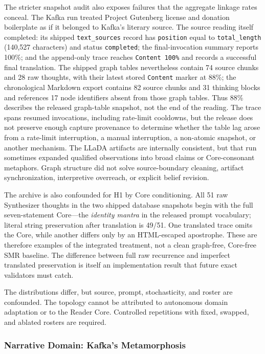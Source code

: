 The stricter snapshot audit also exposes failures that the aggregate linkage
rates conceal. The Kafka run treated Project Gutenberg license and donation
boilerplate as if it belonged to Kafka's literary source. The source reading
itself completed: its shipped \texttt{text\_sources} record has \texttt{position}
equal to \texttt{total\_length} (140,527 characters) and status
\texttt{completed}; the final-invocation summary reports 100\%; and the
append-only trace reaches \texttt{Content 100\%} and records a successful final
translation. The shipped graph tables nevertheless contain 74 source chunks and
28 raw thoughts, with their latest stored \texttt{Content} marker at 88\%; the
chronological Markdown export contains 82 source chunks and 31 thinking blocks
and references 17 node identifiers absent from those graph tables. Thus 88\%
describes the released graph-table snapshot, not the end of the reading. The
trace spans resumed invocations, including rate-limit cooldowns, but the release
does not preserve enough capture provenance to determine whether the table lag
arose from a rate-limit interruption, a manual interruption, a non-atomic
snapshot, or another mechanism.
The LLaDA artifacts are internally consistent, but that run sometimes
expanded qualified observations into broad claims or Core-consonant metaphors.
Graph structure did not solve source-boundary cleaning, artifact synchronization, interpretive overreach, or explicit belief revision.

The archive is also confounded for H1 by Core conditioning. All 51 raw
Synthesizer thoughts in the two shipped database snapshots begin with the full
seven-statement Core---the \emph{identity mantra} in the released prompt
vocabulary; literal string preservation after translation is 49/51.
One translated trace omits the Core, while another differs only by an
HTML-escaped apostrophe. These are therefore examples of the integrated treatment,
not a clean graph-free, Core-free SMR baseline. The difference between full raw
recurrence and imperfect translated preservation is itself an implementation
result that future exact validators must catch.

The distributions differ, but source, prompt, stochasticity, and roster are
confounded. The topology cannot be attributed to autonomous domain adaptation
or to the Reader Core. Controlled repetitions with fixed, swapped, and ablated
rosters are required.


\subsubsection{Narrative Domain: Kafka's Metamorphosis}


